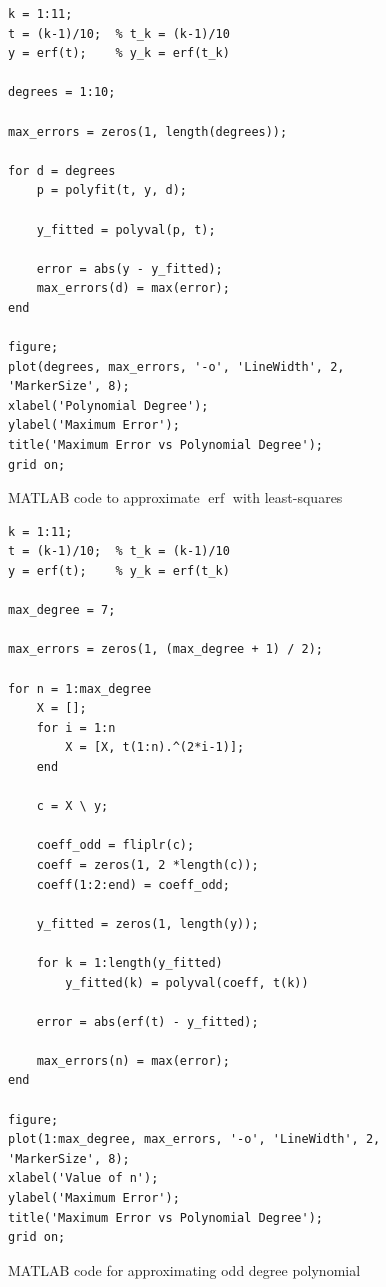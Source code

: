 \documentclass[a4paper, oneside]{article}
\begin{document}
\begin{figure}[h!]
\begin{verbatim}
k = 1:11;
t = (k-1)/10;  % t_k = (k-1)/10
y = erf(t);    % y_k = erf(t_k)

degrees = 1:10;

max_errors = zeros(1, length(degrees));

for d = degrees
    p = polyfit(t, y, d);

    y_fitted = polyval(p, t);

    error = abs(y - y_fitted); 
    max_errors(d) = max(error);
end

figure;
plot(degrees, max_errors, '-o', 'LineWidth', 2, 'MarkerSize', 8);
xlabel('Polynomial Degree');
ylabel('Maximum Error');
title('Maximum Error vs Polynomial Degree');
grid on;
\end{verbatim}
\caption{MATLAB code to approximate $\operatorname{erf}$ with least-squares}
\label{fig:erf-code}
\end{figure}

\begin{figure}
    \begin{verbatim}
k = 1:11;
t = (k-1)/10;  % t_k = (k-1)/10
y = erf(t);    % y_k = erf(t_k)

max_degree = 7;

max_errors = zeros(1, (max_degree + 1) / 2);

for n = 1:max_degree
    X = [];
    for i = 1:n
        X = [X, t(1:n).^(2*i-1)];
    end
    
    c = X \ y;
    
    coeff_odd = fliplr(c);
    coeff = zeros(1, 2 *length(c));
    coeff(1:2:end) = coeff_odd;

    y_fitted = zeros(1, length(y));
    
    for k = 1:length(y_fitted)
        y_fitted(k) = polyval(coeff, t(k))

    error = abs(erf(t) - y_fitted);
    
    max_errors(n) = max(error);
end

figure;
plot(1:max_degree, max_errors, '-o', 'LineWidth', 2, 'MarkerSize', 8);
xlabel('Value of n');
ylabel('Maximum Error');
title('Maximum Error vs Polynomial Degree');
grid on;
    \end{verbatim}
    \caption{MATLAB code for approximating odd degree polynomial}
    \label{fig:erf-odd-code}
\end{figure}
\end{document}
